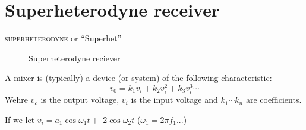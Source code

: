 \documentclass[11pt]{article} %
\begin{document}
\section{Superheterodyne receiver}
	\textsc{superheterodyne} or ``Superhet''

	\begin{figure}[h]
		\centering
		\begin{tikzpicture}
		\end{tikzpicture}
		\label{fig:superhetrec}
		\caption{Superheterodyne reciever}
	\end{figure}

	A mixer is (typically) a device (or system) of the following characteristic:-
		\begin{equation}
			v_0 = k_1v_i+k_2v_i^2+k_3v_i^3 \cdots
		\end{equation}
		Wehre $v_o$ is the output voltage, $v_i$ is the input voltage and $k_1 \cdots k_n$ are coefficients.

	If we let $v_i=a_1 \cos{\omega_1t} + \_2 \cos{\omega_2t} \label{eq:het}$ ($\omega_1=2\pi f_1$...)
\end{document}
